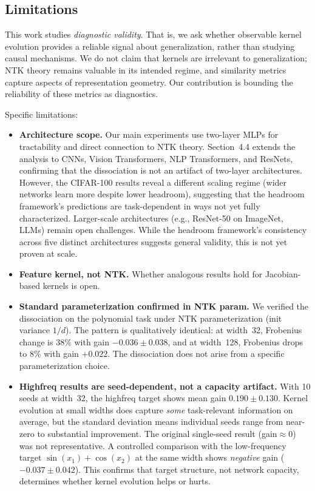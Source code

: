 \documentclass[twoside,11pt]{article}
\begin{document}
\subsection{Limitations}
This work studies \emph{diagnostic validity}. That is, we ask whether observable kernel evolution provides a reliable signal about generalization, rather than studying causal mechanisms.  We do not claim that kernels are irrelevant to generalization; NTK theory remains valuable in its intended regime, and similarity metrics capture aspects of representation geometry.  Our contribution is bounding the reliability of these metrics as diagnostics.

Specific limitations:
\begin{itemize}
    \item \textbf{Architecture scope.}  Our main experiments use two-layer MLPs for tractability and direct connection to NTK theory.  Section~4.4 extends the analysis to CNNs, Vision Transformers, NLP Transformers, and ResNets, confirming that the dissociation is not an artifact of two-layer architectures.  However, the CIFAR-100 results reveal a different scaling regime (wider networks learn more despite lower headroom), suggesting that the headroom framework's predictions are task-dependent in ways not yet fully characterized.  Larger-scale architectures (e.g., ResNet-50 on ImageNet, LLMs) remain open challenges.  While the headroom framework's consistency across five distinct architectures suggests general validity, this is not yet proven at scale.
    \item \textbf{Feature kernel, not NTK.}  Whether analogous results hold for Jacobian-based kernels is open.
    \item \textbf{Standard parameterization confirmed in NTK param.}  We verified the dissociation on the polynomial task under NTK parameterization (init variance $1/d$). The pattern is qualitatively identical: at width~32, Frobenius change is $38\%$ with gain $-0.036\pm0.038$, and at width~128, Frobenius drops to $8\%$ with gain $+0.022$. The dissociation does not arise from a specific parameterization choice.
    \item \textbf{Highfreq results are seed-dependent, not a capacity artifact.}  With 10 seeds at width~32, the highfreq target shows mean gain $0.190\pm0.130$. Kernel evolution at small widths does capture \emph{some} task-relevant information on average, but the standard deviation means individual seeds range from near-zero to substantial improvement.  The original single-seed result (gain$\approx0$) was not representative.  A controlled comparison with the low-frequency target $\sin(x_1)+\cos(x_2)$ at the same width shows \emph{negative} gain ($-0.037\pm0.042$). This confirms that target structure, not network capacity, determines whether kernel evolution helps or hurts.

\end{itemize}
\end{document}
